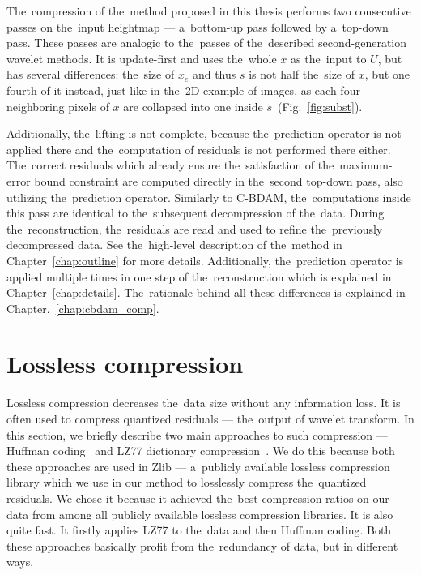 The~compression of the~method proposed in this thesis performs two consecutive passes on the~input heightmap --- a~bottom-up pass followed by a~top-down pass. These passes are analogic to the~passes of the~described second-generation wavelet methods. It is update-first and uses the~whole $x$ as the~input to $U$, but has several differences: the~size of $x_e$ and thus $s$ is not half the~size of $x$, but one fourth of it instead, just like in the~2D example of images, as each four neighboring pixels of $x$ are collapsed into one inside $s$~(Fig.~\ref{fig:subst}).

Additionally, the~lifting is not complete, because the~prediction operator is not applied there and the~computation of residuals is not performed there either. The~correct residuals which already ensure the~satisfaction of the~maximum-error bound constraint are computed directly in the~second top-down pass, also utilizing the~prediction operator. Similarly to C-BDAM, the~computations inside this pass are identical to the~subsequent decompression of the~data. During the~reconstruction, the~residuals are read and used to refine the~previously decompressed data. See the~high-level description of the~method in Chapter~\ref{chap:outline} for more details. Additionally, the~prediction operator is applied multiple times in one step of the~reconstruction which is explained in Chapter~\ref{chap:details}. The~rationale behind all these differences is explained in Chapter.~\ref{chap:cbdam_comp}.

\section{Lossless compression}\label{sec:lossless_comp}

Lossless compression decreases the~data size without any information loss. It is often used to compress quantized residuals --- the~output of wavelet transform. In this section, we briefly describe two main approaches to such compression --- Huffman coding~\cite{huffman} and LZ77 dictionary compression~\cite{lz77}. We do this because both these approaches are used in Zlib --- a~publicly available lossless compression library which we use in our method to losslessly compress the~quantized residuals. We chose it because it achieved the~best compression ratios on our data from among all publicly available lossless compression libraries. It is also quite fast. It firstly applies LZ77 to the~data and then Huffman coding. Both these approaches basically profit from the~redundancy of data, but in different ways.

